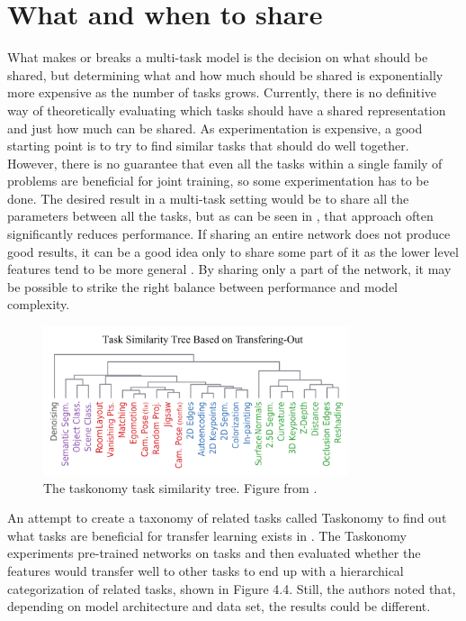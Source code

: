 \section{What and when to share}
What makes or breaks a multi-task model is the decision on what should be shared, but determining what and how much should be shared is exponentially more expensive as the number of tasks grows.
Currently, there is no definitive way of theoretically evaluating which tasks should have a shared representation and just how much can be shared.
As experimentation is expensive, a good starting point is to try to find similar tasks that should do well together. 
However, there is no guarantee that even all the tasks within a single family of problems are beneficial for joint training, so some experimentation has to be done. 
The desired result in a multi-task setting would be to share all the parameters between all the tasks, but as can be seen in \citep{uberNet}, that approach often significantly reduces performance.
If sharing an entire network does not produce good results, it can be a good idea only to share some part of it as the lower level features tend to be more general \citep{transferringMidLevelRepresentations}. 
By sharing only a part of the network, it may be possible to strike the right balance between performance and model complexity.

\begin{figure}[h!] 
\centering 
\includegraphics[width=0.8\textwidth]{imgs/taskonomy.png}
\caption{The taskonomy task similarity tree. Figure from \citep{taskonomy}.\label{fig:params}}
\end{figure}

An attempt to create a taxonomy of related tasks called Taskonomy to find out what tasks are beneficial for transfer learning exists in \citep{taskonomy}. 
The Taskonomy experiments pre-trained networks on tasks and then evaluated whether the features would transfer well to other tasks to end up with a hierarchical categorization of related tasks, shown in Figure 4.4. 
Still, the authors noted that, depending on model architecture and data set, the results could be different.

